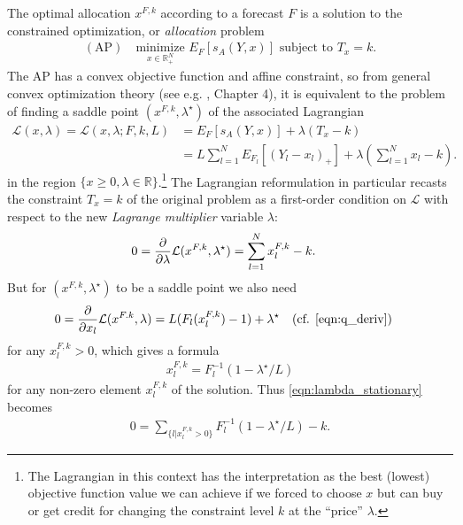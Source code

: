 \documentclass{article}
\begin{document}
The optimal allocation $x^{F,k}$ according to a forecast $F$ is a solution to the constrained optimization, or \emph{allocation} problem
\begin{align}
    (\mathrm{AP}) \quad \underset{x \in \mathbb{R}_{+}^N}{\mathrm{minimize}}\,\, E_{F}\left[s_A(Y,x)\right] \text{ subject to } 
    T_x = k. \label{AP}
\end{align}
The AP has a convex objective function and affine constraint, so from general convex optimization theory 
(see e.g. \cite{ruszczynski2011nonlinear}, Chapter 4), it is equivalent to the
problem of finding a saddle point $(x^{F,k}, \lambda^{\star})$ of the associated Lagrangian 
\begin{align}
\mathcal{L}(x, \lambda) = \mathcal{L}(x, \lambda; F, k, L) 
&= E_F\left[s_A(Y,x)\right] + \lambda(T_x - k) \\
&= L\sum_{l=1}^{N} E_{F_l}[(Y_l - x_l)_{+}] + \lambda\left(\sum_{l=1}^{N} x_l - k\right).  
\end{align}
in the region $\{x \geq 0, \lambda \in \mathbb{R}\}$.\footnote{The Lagrangian in this context has the interpretation as the best (lowest) objective function value we can achieve if we forced to choose $x$ but can buy or get credit for changing the constraint level $k$ 
at the ``price'' $\lambda$.}
The Lagrangian reformulation in particular recasts the constraint $T_x=k$ of the original problem as a first-order condition on $\mathcal{L}$ with respect to the new \emph{Lagrange multiplier} variable $\lambda$:
\begin{align}
0 = \frac{\partial {} }{\partial {\lambda}} \mathcal{L}(x^{F,k}, \lambda^{\star}) &= \sum_{l=1}^{N} x_l^{F,k} - k. \label{eqn:lambda_stationary}
\end{align}
But for $(x^{F,k}, \lambda^{\star})$ to be a saddle point we also need
\begin{align}
0 = \frac{\partial}{\partial x_l} \mathcal{L}(x^{F.k}, \lambda) &= L(F_l(x_l^{F,k})-1) + \lambda^{\star} 
\quad (\text{cf. \eqref{eqn:q_deriv}}) \label{eqn:x_stationary}
\end{align}
for any $x_l^{F,k} > 0$, which gives a formula 
\begin{align}
x_l^{F,k} = F_l^{-1}(1-\lambda^{\star}/L) \label{eqn:xfk_formula}
\end{align}
for any non-zero element $x_l^{F,k}$ of the solution. Thus \eqref{eqn:lambda_stationary} becomes
\begin{align}
0 = \sum_{\{l | x_l^{F,k} > 0\}} F_{l}^{-1}(1-\lambda^{\star}/L) - k. \label{eqn:lambda_stationary2}
\end{align}
\end{document}
